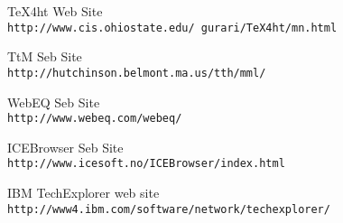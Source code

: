 \begin{thebibliography}{99}
 TeX4ht Web Site
\\
{\tt http://www.cis.ohio\-state.edu/~gurari/TeX4ht/mn.html }

 TtM Seb Site
\\
{\tt http://hutchinson.belmont.ma.us/tth/mml/ }

 WebEQ Seb Site
\\
{\tt http://www.webeq.com/webeq/}

 ICEBrowser Seb Site
\\
{\tt http://www.icesoft.no/ICEBrowser/index.html }

 IBM TechExplorer web site
\\
{\tt http://www\-4.ibm.com/software/network/techexplorer/ }









\end{thebibliography}

                                 

